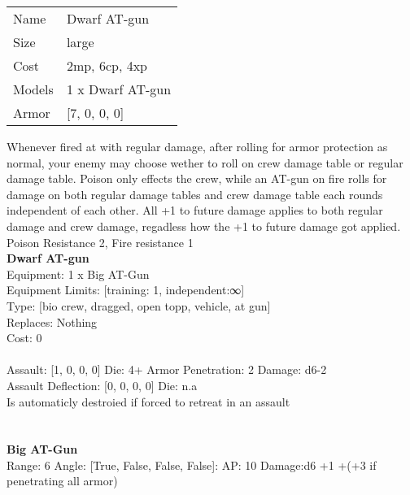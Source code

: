\begin{tabular}{ll}
  Name & Dwarf AT-gun \\
  Size & large\\
  Cost & 2mp, 6cp, 4xp\\
  Models & 1 x Dwarf AT-gun\\
  Armor & [7, 0, 0, 0]\\
\end{tabular}

\noindent Whenever fired at with regular damage, after rolling for armor protection as normal, your enemy may choose wether to roll on crew damage table or regular damage table. Poison only effects the crew, while an AT-gun on fire rolls for damage on both regular damage tables and crew damage table each rounds independent of each other. All +1 to future damage applies to both regular damage and crew damage, regadless how the +1 to future damage got applied.\\ 
 Poison Resistance 2, Fire resistance 1\\ 


{\bf Dwarf AT-gun } \\
Equipment: 1 x Big AT-Gun \\
Equipment Limits: [training: 1, independent:∞] \\
Type: [bio crew, dragged, open topp, vehicle, at gun] \\
Replaces: Nothing \\
Cost: 0\\
\ \\
Assault: [1, 0, 0, 0] Die: 4+ Armor Penetration: 2 Damage: d6-2 \\
Assault Deflection: [0, 0, 0, 0] Die: n.a\\
\indent Is automaticly destroied if forced to retreat in an assault\\ 
 
\ \\

\ \\
{\bf Big AT-Gun } \\



Range: 6  Angle: [True, False, False, False]: AP: 10 Damage:d6 +1 +(+3 if penetrating all armor) \\




 
\ \\




